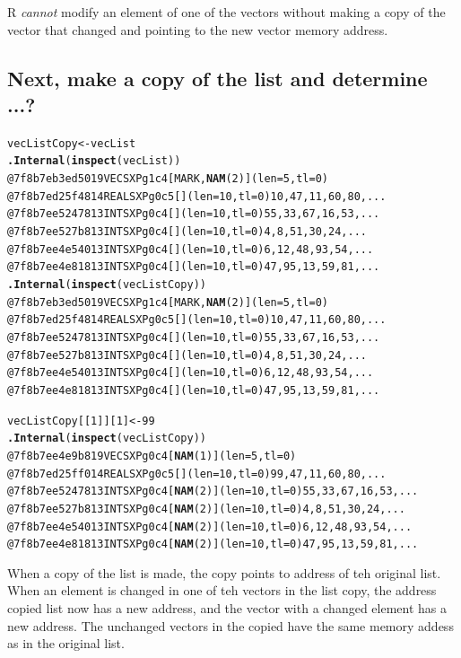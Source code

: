 \documentclass{article}\usepackage[]{graphicx}\usepackage[]{color}
\makeatletter
\newcommand{\hlkwd}[1]{\textcolor[rgb]{0.737,0.353,0.396}{\textbf{#1}}}%
\newenvironment{kframe}{%
 \def\at@end@of@kframe{}%
 \ifinner\ifhmode%
  \def\at@end@of@kframe{\end{minipage}}%
  \begin{minipage}{\columnwidth}%
 \fi\fi%
 \def\FrameCommand##1{\hskip\@totalleftmargin \hskip-\fboxsep
 \colorbox{shadecolor}{##1}\hskip-\fboxsep
     \hskip-\linewidth \hskip-\@totalleftmargin \hskip\columnwidth}%
 \MakeFramed {\advance\hsize-\width
   \@totalleftmargin\z@ \linewidth\hsize
   \@setminipage}}%
 {\par\unskip\endMakeFramed%
 \at@end@of@kframe}
\newenvironment{knitrout}{}{} %
\makeatother
\begin{document}
R \textit{cannot} modify an element of one of the vectors without making a copy of the vector that changed and pointing to the new vector memory address.

\subsection{Next, make a copy of the list and determine ...?} %

\begin{knitrout}
\color{fgcolor}\begin{kframe}
\begin{alltt}
vecListCopy <- vecList
\hlkwd{.Internal}(\hlkwd{inspect}(vecList))
@7f8b7eb3ed50 19 VECSXP g1c4 [MARK,\hlkwd{NAM}(2)] (len=5, tl=0)
  @7f8b7ed25f48 14 REALSXP g0c5 [] (len=10, tl=0) 10,47,11,60,80,...
  @7f8b7ee52478 13 INTSXP g0c4 [] (len=10, tl=0) 55,33,67,16,53,...
  @7f8b7ee527b8 13 INTSXP g0c4 [] (len=10, tl=0) 4,8,51,30,24,...
  @7f8b7ee4e540 13 INTSXP g0c4 [] (len=10, tl=0) 6,12,48,93,54,...
  @7f8b7ee4e818 13 INTSXP g0c4 [] (len=10, tl=0) 47,95,13,59,81,...
\hlkwd{.Internal}(\hlkwd{inspect}(vecListCopy))
@7f8b7eb3ed50 19 VECSXP g1c4 [MARK,\hlkwd{NAM}(2)] (len=5, tl=0)
  @7f8b7ed25f48 14 REALSXP g0c5 [] (len=10, tl=0) 10,47,11,60,80,...
  @7f8b7ee52478 13 INTSXP g0c4 [] (len=10, tl=0) 55,33,67,16,53,...
  @7f8b7ee527b8 13 INTSXP g0c4 [] (len=10, tl=0) 4,8,51,30,24,...
  @7f8b7ee4e540 13 INTSXP g0c4 [] (len=10, tl=0) 6,12,48,93,54,...
  @7f8b7ee4e818 13 INTSXP g0c4 [] (len=10, tl=0) 47,95,13,59,81,...

vecListCopy[[1]][1] <- 99
\hlkwd{.Internal}(\hlkwd{inspect}(vecListCopy))
@7f8b7ee4e9b8 19 VECSXP g0c4 [\hlkwd{NAM}(1)] (len=5, tl=0)
  @7f8b7ed25ff0 14 REALSXP g0c5 [] (len=10, tl=0) 99,47,11,60,80,...
  @7f8b7ee52478 13 INTSXP g0c4 [\hlkwd{NAM}(2)] (len=10, tl=0) 55,33,67,16,53,...
  @7f8b7ee527b8 13 INTSXP g0c4 [\hlkwd{NAM}(2)] (len=10, tl=0) 4,8,51,30,24,...
  @7f8b7ee4e540 13 INTSXP g0c4 [\hlkwd{NAM}(2)] (len=10, tl=0) 6,12,48,93,54,...
  @7f8b7ee4e818 13 INTSXP g0c4 [\hlkwd{NAM}(2)] (len=10, tl=0) 47,95,13,59,81,...
\end{alltt}
\end{kframe}
\end{knitrout}

When a copy of the list is made, the copy points to address of teh original list. When an element is changed in one of teh vectors in the list copy, the address copied list now has a new address, and the vector with a changed element has a new address. The unchanged vectors in the copied have the same memory addess as in the original list. 
\end{document}
